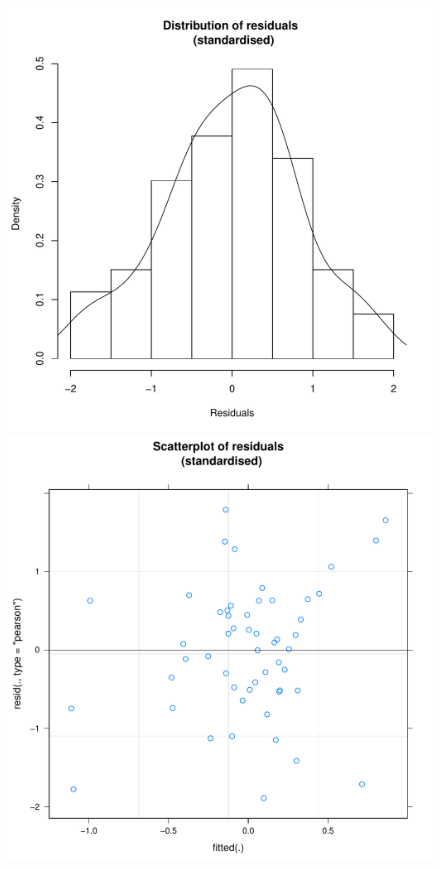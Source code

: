\begin{CJK}{UTF8}{gbsn}



\begin{figure}[htbp]
    \includegraphics[scale =.4]{images/TEM22TeamHist.pdf}
    \includegraphics[scale =.4]{images/TEM22TeamScatter.pdf}

\end{figure}
\end{CJK}
